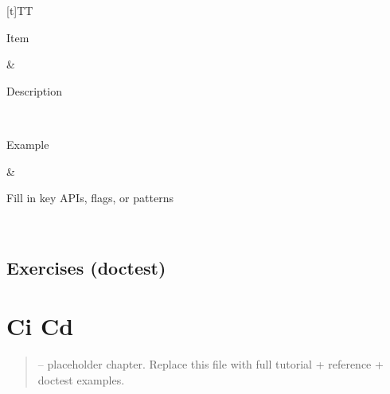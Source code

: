 \documentclass[a4paper,11pt,english]{sphinxmanual}
\begin{document}
\begin{savenotes}\sphinxattablestart
\sphinxthistablewithglobalstyle
\centering
\begin{tabulary}{\linewidth}[t]{TT}
\sphinxtoprule
\begin{varwidth}[t]{}
\sphinxstyletheadfamily \sphinxAtStartPar
Item
\sphinxbeforeendvarwidth
\end{varwidth}%
&\begin{varwidth}[t]{}
\sphinxstyletheadfamily \sphinxAtStartPar
Description
\sphinxbeforeendvarwidth
\end{varwidth}%
\\
\sphinxmidrule
\sphinxtableatstartofbodyhook\begin{varwidth}[t]{}
\sphinxAtStartPar
Example
\sphinxbeforeendvarwidth
\end{varwidth}%
&\begin{varwidth}[t]{}
\sphinxAtStartPar
Fill in key APIs, flags, or patterns
\sphinxbeforeendvarwidth
\end{varwidth}%
\\
\sphinxbottomrule
\end{tabulary}
\sphinxtableafterendhook\par
\sphinxattableend\end{savenotes}


\subsection{Exercises (doctest)}
\label{\detokenize{best_practices/security:exercises-doctest}}
\begin{sphinxVerbatim}[commandchars=\\\{\}]
\end{sphinxVerbatim}

\sphinxstepscope


\section{Ci Cd}
\label{\detokenize{tooling/ci_cd:ci-cd}}\label{\detokenize{tooling/ci_cd::doc}}\begin{quote}

\sphinxAtStartPar
{} – placeholder chapter. Replace this file with full tutorial + reference + doctest examples.
\end{quote}
\end{document}
